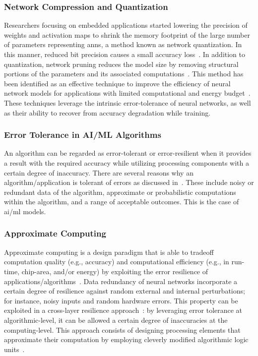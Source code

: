 \subsubsection{Network Compression and Quantization}
Researchers focusing on embedded applications started lowering the precision of weights and activation maps to shrink the memory footprint of the large number of parameters representing \glspl{ann}, a method known as network quantization. In this manner, reduced bit precision causes a small accuracy loss~\cite{courbariaux2015binaryconnect, han2015deep, hubara2017quantized, rastegari2016xnor}. In addition to quantization, network pruning reduces the model size by removing structural portions of the parameters and its associated computations~\cite{lecun1989optimal,hassibi1992second}. This method has been identified as an effective technique to improve the efficiency of neural network models for applications with limited computational and energy budget~\cite{molchanov2016pruning,li2016pruning, liu2018rethinking}. These techniques leverage the intrinsic error-tolerance of neural networks, as well as their ability to recover from accuracy degradation while training.

\subsubsection{Error Tolerance in AI/ML Algorithms}
An algorithm can be regarded as error-tolerant or error-resilient when it provides a result with the required accuracy while utilizing processing components with a certain degree of inaccuracy. There are several reasons why an algorithm/application is tolerant of errors as discussed in~\cite{chippa2013analysis}. These include noisy or redundant data of the algorithm, approximate or probabilistic computations within the algorithm, and a range of acceptable outcomes. This is the case of \gls{ai}/\gls{ml} models.


\subsubsection{Approximate Computing}
Approximate computing is a design paradigm that is able to tradeoff computation quality (e.g., accuracy) and computational efficiency (e.g., in run-time, chip-area, and/or energy) by exploiting the error resilience of applications/algorithms~\cite{gillani2020exploiting, zhang2015approxann}. Data redundancy of neural networks incorporate a certain degree of resilience against random external and internal perturbations;
for instance, noisy inputs and random hardware errors. This property can be exploited in a cross-layer resilience approach~\cite{carter2010design}: by leveraging error tolerance at algorithmic-level, it can be allowed a certain degree of inaccuracies at the computing-level. This approach consists of designing processing elements that approximate their computation by employing cleverly modified algorithmic logic units~\cite{han2013approximate}.

